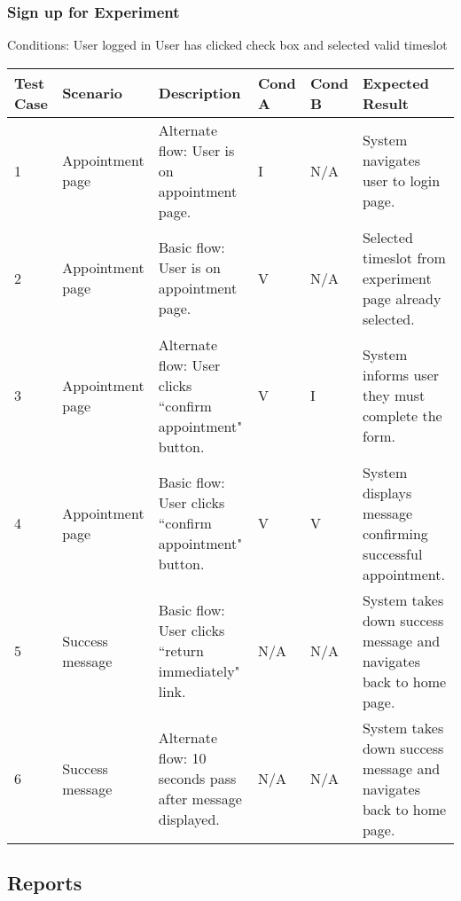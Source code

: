 \begin{landscape}
\subsubsection{Sign up for Experiment}
\begin{outline}[enumerate]
\1 [] Conditions:
\2 [A] User logged in
\2 [B] User has clicked check box and selected valid timeslot
\end{outline}
\begin{table}[!h]
    \begin{tabular}{|l|p{1in}|p{2.5in}|l|l|p{2.5in}|}
        \hline
        Test Case & Scenario & Description & Cond A & Cond B & Expected Result \\ \hline
        1 & Appointment page & Alternate flow: User is on appointment page. & I & N/A & System navigates user to login page. \\ \hline
        2 & Appointment page & Basic flow: User is on appointment page. & V & N/A & Selected timeslot from experiment page already selected. \\ \hline
        3 & Appointment page & Alternate flow: User clicks ``confirm appointment" button. & V & I & System informs user they must complete the form. \\ \hline
        4 & Appointment page & Basic flow: User clicks ``confirm appointment" button. & V & V & System displays message confirming successful appointment. \\ \hline
        5 & Success message & Basic flow: User clicks ``return immediately" link. & N/A & N/A & System takes down success message and navigates back to home page. \\ \hline
        6 & Success message & Alternate flow: 10 seconds pass after message displayed. & N/A & N/A & System takes down success message and navigates back to home page. \\ \hline
    \end{tabular}
\end{table}

\clearpage
\subsection{Reports}

\end{landscape}
